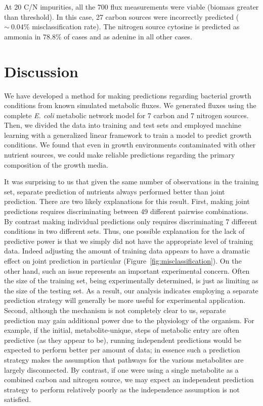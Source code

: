\documentclass[12pt]{article}
\begin{document}
At 20 C/N impurities, all the 700 flux measurements were viable (biomass greater than threshold). In this case, 27 carbon sources were incorrectly predicted ($\sim~0.04\%$ misclassification rate). The nitrogen source cytosine is predicted as ammonia in 78.8\% of cases and as adenine in all other cases.

\section{Discussion}

We have developed a method for making predictions regarding bacterial growth conditions from known simulated metabolic fluxes. We generated fluxes using the complete \emph{E. coli} metabolic network model for 7 carbon and 7 nitrogen sources. Then, we divided the data into training and test sets and employed machine learning with a generalized linear framework to train a model to predict growth conditions. We found that even in growth environments contaminated with other nutrient sources, we could make reliable predictions regarding the primary composition of the growth media.

It was surprising to us that given the same number of observations in the training set, separate prediction of nutrients always performed better than joint prediction. There are two likely explanations for this result. First, making joint predictions requires discriminating between 49 different pairwise combinations. By contrast making individual predictions only requires discriminating 7 different conditions in two different sets. Thus, one possible explanation for the lack of predictive power is that we simply did not have the appropriate level of training data. Indeed adjusting the amount of training data appears to have a dramatic effect on joint prediction in particular (Figure~\ref{fig:misclassification}). On the other hand, such an issue represents an important experimental concern. Often the size of the training set, being experimentally determined, is just as limiting as the size of the testing set. As a result, our analysis indicates employing a separate prediction strategy will generally be more useful for experimental application. Second, although the mechanism is not completely clear to us, separate prediction may gain additional power due to the physiology of the organism. For example, if the initial, metabolite-unique, steps of metabolic entry are often predictive (as they appear to be), running independent predictions would be expected to perform better per amount of data; in essence such a prediction strategy makes the assumption that pathways for the various metabolites are largely disconnected. By contrast, if one were using a single metabolite as a combined carbon and nitrogen source, we may expect an independent prediction strategy to perform relatively poorly as the independence assumption is not satisfied.
\end{document}

